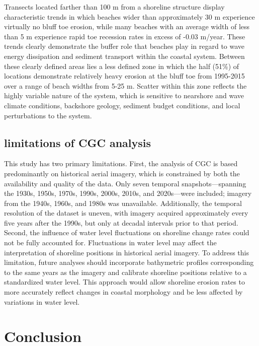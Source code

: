 Transects located farther than 100 m from a shoreline structure display
characteristic trends in which beaches wider than approximately 30 m experience
virtually no bluff toe erosion, while many beaches with an average width of less
than 5 m experience rapid toe recession rates in excess of -0.03 m/year. These
trends clearly demonstrate the buffer role that beaches play in regard to wave
energy dissipation and sediment transport within the coastal system. Between
these clearly defined areas lies a less defined zone in which the half (51\%) of
locations demonstrate relatively heavy erosion at the bluff toe from 1995-2015
over a range of beach widths from 5-25 m. Scatter within this zone reflects the
highly variable nature of the system, which is sensitive to nearshore and wave
climate conditions, backshore geology, sediment budget conditions, and local
perturbations to the system. 

\subsection{limitations of CGC analysis} 
\label{limitations of CGC analysis}

This study has two primary limitations. First, the analysis of CGC is based
predominantly on historical aerial imagery, which is constrained by both the
availability and quality of the data. Only seven temporal snapshots—spanning the
1930s, 1950s, 1970s, 1990s, 2000s, 2010s, and 2020s—were included; imagery from
the 1940s, 1960s, and 1980s was unavailable. Additionally, the temporal
resolution of the dataset is uneven, with imagery acquired approximately every
five years after the 1990s, but only at decadal intervals prior to that period.
Second, the influence of water level fluctuations on shoreline change rates
could not be fully accounted for. Fluctuations in water level may affect the
interpretation of shoreline positions in historical aerial imagery. To address
this limitation, future analyses should incorporate bathymetric profiles
corresponding to the same years as the imagery and calibrate shoreline positions
relative to a standardized water level. This approach would allow shoreline
erosion rates to more accurately reflect changes in coastal morphology and be
less affected by variations in water level.

\section{Conclusion} 
\label{Conclusion} 

